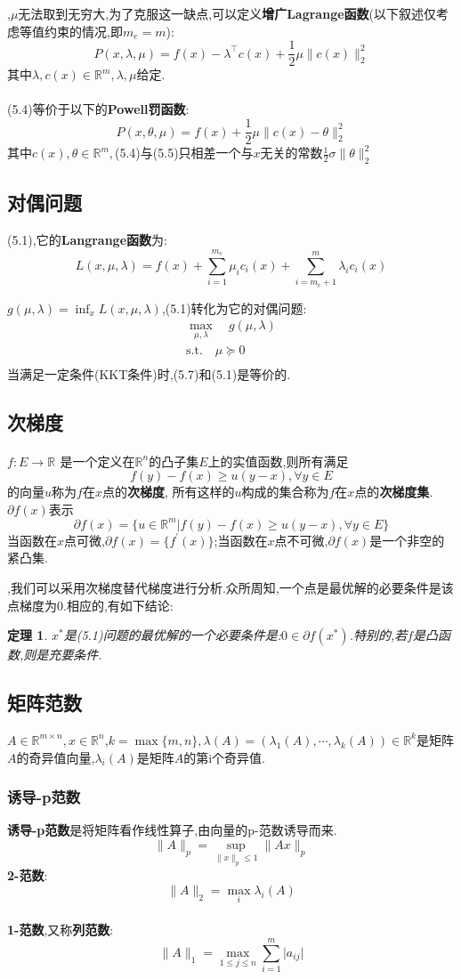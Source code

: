\documentclass[UTF8]{ctexart}
\newtheorem{theo}{定理}[section]
\newcommand{\s}{\quad}
\renewcommand{\b}{\textbf}
\newcommand{\p}{\paragraph{}\s}
\newcommand{\ssect}{\subsection}
\newcommand{\sssect}{\subsubsection}
\newcommand{\equSplit}[1]{\begin{equation}\begin{split}#1\end{split}\end{equation}}
\newcommand{\equ}[1]{\begin{equation}#1\end{equation}}
\newcommand{\Tst}{\text{s.t.}\s}
\newcommand{\abs}[1]{\lvert#1\rvert}
\newcommand{\norm}[1]{\lVert#1\rVert}
\newcommand{\Real}[1]{\mathbb{R}^{#1}}
\numberwithin{equation}{section}
\begin{document}
		,$\mu$无法取到无穷大,为了克服这一缺点,可以定义\b{增广Lagrange函数}(以下叙述仅考虑等值约束的情况,即$m_e=m$):
		\equ{P(x,\lambda,\mu)=f(x)-\lambda^\top c(x)+\frac{1}{2}\mu\norm{c(x)}^2_2}
		其中$\lambda,c(x)\in\Real{m},\lambda,\mu$给定.

		\p(5.4)等价于以下的\b{Powell罚函数}:
		\equ{P(x,\theta,\mu)=f(x)+\frac{1}{2}\mu\norm{c(x)-\theta}^2_2}
		其中$c(x),\theta\in\Real{m}$,\,(5.4)与(5.5)只相差一个与$x$无关的常数$\frac{1}{2}\sigma\norm{\theta}^2_2$

		\ssect{对偶问题}

		(5.1),它的\b{Langrange函数}为:
		\equ{L(x,\mu,\lambda)=f(x)+\sum^{m_e}_{i=1}\mu_ic_i(x)+\sum^{m}_{i=m_e+1}\lambda_ic_i(x)}

		$g(\mu,\lambda)=\inf_xL(x,\mu,\lambda)$,(5.1)转化为它的对偶问题:
		\equSplit{
			\max_{\mu,\lambda}\s g(\mu,\lambda)\\
			\Tst\mu\succeq0\\
		}
		当满足一定条件(KKT条件)时,(5.7)和(5.1)是等价的.

		\ssect{次梯度}

		\p$f:E\rightarrow\Real{}$
		是一个定义在$\Real{n}$的凸子集$E$上的实值函数,则所有满足
		\equ{f(y)-f(x)\geq u(y-x),\forall y\in E}
		的向量$u$称为$f$在$x$点的\b{次梯度},
		所有这样的$u$构成的集合称为$f$在$x$点的\b{次梯度集}.
		$\partial f(x)$表示
		\equ{\partial f(x)=\{u\in\Real{m}\vert f(y)-f(x)\geq u(y-x),\forall y\in E\}}
		当函数在$x$点可微,$\partial f(x)=\{f^\prime(x)\}$;当函数在$x$点不可微,$\partial f(x)$是一个非空的紧凸集.

		,我们可以采用次梯度替代梯度进行分析.众所周知,一个点是最优解的必要条件是该点梯度为0.相应的,有如下结论:
		\begin{theo}
			$x^*$是(5.1)问题的最优解的一个必要条件是:$0\in\partial f(x^*)$.特别的,若$f$是凸函数,则是充要条件.
		\end{theo}

		\ssect{矩阵范数}
		$A\in\Real{m\times n},x\in\Real{n}$,$k=\max\{m,n\},\lambda(A)=(\lambda_1(A),\cdots,\lambda_k(A))\in\Real{k}$是矩阵$A$的奇异值向量,$\lambda_i(A)$是矩阵$A$的第i个奇异值.
		\sssect{诱导-p范数}
		\b{诱导-p范数}是将矩阵看作线性算子,由向量的p-范数诱导而来.
		\[\norm{A}_p=\sup_{\norm{x}_p\leq1}\norm{Ax}_p\]
		\b{2-范数}:
		\[\norm{A}_2=\max_i\lambda_i(A)\]

		\p\b{1-范数},又称\b{列范数}:
		\[\norm{A}_1=\max_{1\leq j\leq n}\sum_{i=1}^m\abs{a_{ij}}\]
\end{document}
